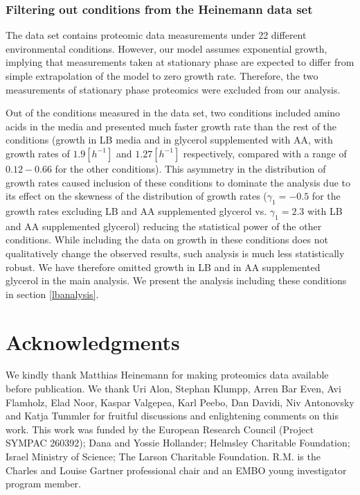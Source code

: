 \documentclass{article}
\begin{document}
\subsubsection{Filtering out conditions from the Heinemann data set}
\label{heinemanncond} 

The \cite{Schmidt2015} data set contains proteomic data measurements under 22 different environmental conditions.
However, our model assumes exponential growth, implying that measurements taken at stationary phase are expected to differ from simple extrapolation of the model to zero growth rate.
Therefore, the two measurements of stationary phase proteomics were excluded from our analysis.

Out of the conditions measured in the \cite{Schmidt2015} data set, two conditions included amino acids in the media and presented much faster growth rate than the rest of the conditions (growth in LB media and in glycerol supplemented with AA, with growth rates of $1.9[h^{-1}]$ and $1.27[h^{-1}]$ respectively, compared with a range of $0.12-0.66$ for the other conditions).
This asymmetry in the distribution of growth rates caused inclusion of these conditions to dominate the analysis due to its effect on the skewness of the distribution of growth rates ($\gamma_1=-0.5$ for the growth rates excluding LB and AA supplemented glycerol vs. $\gamma_1=2.3$ with LB and AA supplemented glycerol) reducing the statistical power of the other conditions.
While including the data on growth in these conditions does not qualitatively change the observed results, such analysis is much less statistically robust.
We have therefore omitted growth in LB and in AA supplemented glycerol in the main analysis.
We present the analysis including these conditions in section \ref{lbanalysis}.



\section{Acknowledgments}
We kindly thank Matthias Heinemann for making proteomics data available before publication.
We thank Uri Alon, Stephan Klumpp, Arren Bar Even, Avi Flamholz, Elad Noor, Kaspar Valgepea, Karl Peebo, Dan Davidi, Niv Antonovsky and Katja Tummler for fruitful discussions and enlightening comments on this work.
This work was funded by the European Research Council (Project SYMPAC 260392); Dana and Yossie Hollander; Helmsley Charitable Foundation; Israel Ministry of Science; The Larson Charitable Foundation.
R.M. is the Charles and Louise Gartner professional chair and an EMBO young investigator program member.
\end{document}
